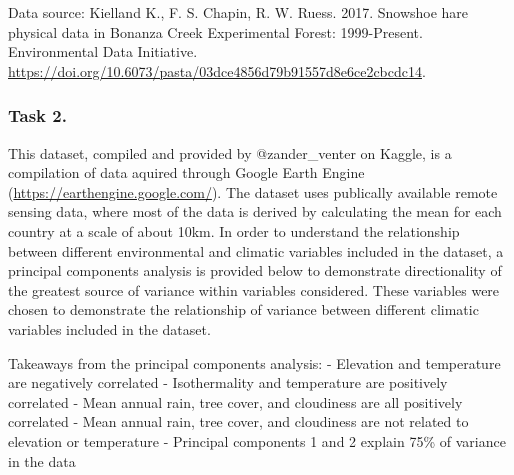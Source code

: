 \documentclass[]{article}
\newenvironment{Shaded}{\begin{snugshade}}{\end{snugshade}}
\newcommand{\KeywordTok}[1]{\textcolor[rgb]{0.13,0.29,0.53}{\textbf{#1}}}
\newcommand{\DataTypeTok}[1]{\textcolor[rgb]{0.13,0.29,0.53}{#1}}
\newcommand{\StringTok}[1]{\textcolor[rgb]{0.31,0.60,0.02}{#1}}
\newcommand{\CommentTok}[1]{\textcolor[rgb]{0.56,0.35,0.01}{\textit{#1}}}
\newcommand{\OperatorTok}[1]{\textcolor[rgb]{0.81,0.36,0.00}{\textbf{#1}}}
\newcommand{\NormalTok}[1]{#1}
\begin{document}
Data source: Kielland K., F. S. Chapin, R. W. Ruess. 2017. Snowshoe hare
physical data in Bonanza Creek Experimental Forest: 1999-Present.
Environmental Data Initiative.
\url{https://doi.org/10.6073/pasta/03dce4856d79b91557d8e6ce2cbcdc14}.

\subsubsection{Task 2.}\label{task-2.}

This dataset, compiled and provided by @zander\_venter on Kaggle, is a
compilation of data aquired through Google Earth Engine
(\url{https://earthengine.google.com/}). The dataset uses publically
available remote sensing data, where most of the data is derived by
calculating the mean for each country at a scale of about 10km. In order
to understand the relationship between different environmental and
climatic variables included in the dataset, a principal components
analysis is provided below to demonstrate directionality of the greatest
source of variance within variables considered. These variables were
chosen to demonstrate the relationship of variance between different
climatic variables included in the dataset.

Takeaways from the principal components analysis: - Elevation and
temperature are negatively correlated - Isothermality and temperature
are positively correlated - Mean annual rain, tree cover, and cloudiness
are all positively correlated - Mean annual rain, tree cover, and
cloudiness are not related to elevation or temperature - Principal
components 1 and 2 explain 75\% of variance in the data

\begin{Shaded}
\end{Shaded}

\begin{Shaded}
\end{Shaded}
\end{document}
